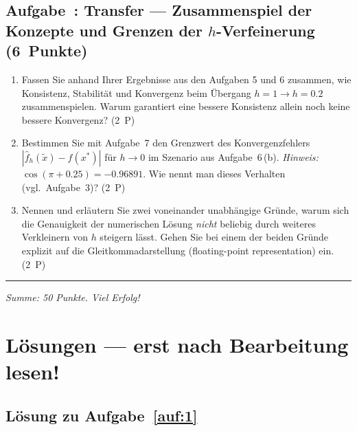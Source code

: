 \documentclass[a4paper,11pt]{scrartcl}
\newcounter{aufgabe}
\newcommand{\Aufgabe}[2]{%
  \refstepcounter{aufgabe}%
  \subsection*{Aufgabe~\theaufgabe: #1 \hfill (#2~Punkte)}%
  \label{auf:\theaufgabe}}
\begin{document}
\schreibraum[11]
\Aufgabe{Transfer --- Zusammenspiel der Konzepte und Grenzen der $h$-Verfeinerung}{6}

\begin{enumerate}[label=(\alph*)]
  \item Fassen Sie anhand Ihrer Ergebnisse aus den Aufgaben 5 und 6 zusammen, wie Konsistenz, Stabilität und Konvergenz beim Übergang $h = 1 \to h = 0.2$ zusammenspielen. Warum garantiert eine bessere Konsistenz allein noch keine bessere Konvergenz? \hfill (2~P)
  \item Bestimmen Sie mit Aufgabe~7 den Grenzwert des Konvergenzfehlers $\left|\hat{f}_h(\tilde{x}) - f(x^*)\right|$ für $h \to 0$ im Szenario aus Aufgabe~6\,(b). \emph{Hinweis:} $\cos(\pi + 0.25) = -0.96891$. Wie nennt man dieses Verhalten (vgl.\ Aufgabe~3)? \hfill (2~P)
  \item Nennen und erläutern Sie zwei voneinander unabhängige Gründe, warum sich die Genauigkeit der numerischen Lösung \emph{nicht} beliebig durch weiteres Verkleinern von $h$ steigern lässt. Gehen Sie bei einem der beiden Gründe explizit auf die Gleitkommadarstellung (floating-point representation) ein. \hfill (2~P)
\end{enumerate}

\bigskip
\hrule
\medskip
\noindent\emph{Summe: 50 Punkte. Viel Erfolg!}

\schreibraum[9]
\newpage

\section*{Lösungen --- erst nach Bearbeitung lesen!}

\subsection*{Lösung zu Aufgabe~\ref{auf:1}}
\end{document}
